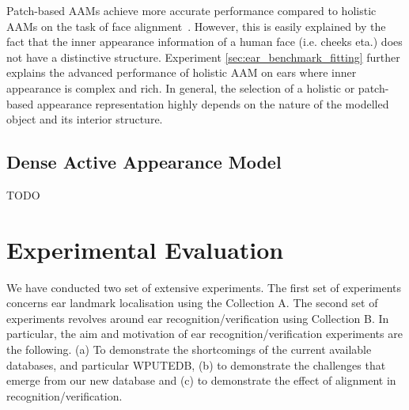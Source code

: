Patch-based AAMs achieve more accurate performance compared to holistic AAMs on the task of face alignment~\cite{Tzimiropoulos2014}. However, this is easily explained by the fact that the inner appearance information of a human face (i.e. cheeks eta.) does not have a distinctive structure. Experiment \ref{sec:ear_benchmark_fitting} further explains the advanced performance of holistic AAM on ears where inner appearance is complex and rich. In general, the selection of a holistic or patch-based appearance representation highly depends on the nature of the modelled object and its interior structure. 

\subsection{Dense Active Appearance Model}
TODO






\section{Experimental Evaluation}

We have conducted two set of extensive experiments. The first set of experiments concerns ear landmark localisation using the Collection A. The second set of experiments revolves around ear recognition/verification using Collection B. In particular, the aim and motivation of ear recognition/verification experiments are the following. (a) To demonstrate the shortcomings of the current available databases, and particular WPUTEDB, (b) to demonstrate the challenges that emerge from our new database and (c) to demonstrate the effect of alignment in recognition/verification.  



